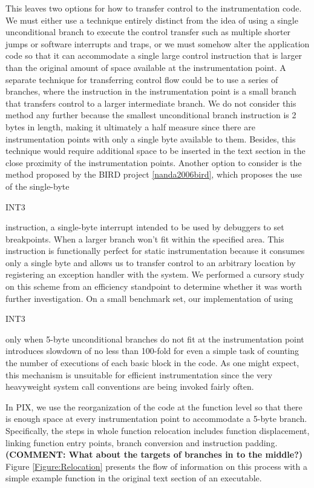 This leaves two options for how to transfer control to the instrumentation code.
We must either use a technique entirely distinct from the idea of using a single
unconditional branch to execute the control transfer such as multiple shorter
jumps or software interrupts and traps, or we must somehow alter the application code so
that it can accommodate a single large control instruction that is larger than
the original amount of space available at the instrumentation point. A separate
technique for transferring control flow could be to use a series of branches,
where the instruction in the instrumentation point is a small branch that
transfers control to a larger intermediate branch. We do not consider this
method any further because the smallest unconditional branch instruction is 2
bytes in length, making it ultimately a half measure since there are
instrumentation points with only a single byte available to them. Besides, this technique would
require additional space to be inserted in the text section in the close proximity of
the instrumentation points. Another option
to consider is the method proposed by the BIRD project \ref{nanda2006bird}, which
proposes the use of the single-byte \begin{it}INT3\end{it} instruction, a single-byte
interrupt intended to be used by debuggers to set breakpoints. When a larger
branch won't fit within the specified area. This instruction is functionally
perfect for static instrumentation because it consumes only a single byte and
allows us to transfer control to an arbitrary location by registering an
exception handler with the system. We performed a cursory study on this scheme
from an efficiency standpoint to determine whether it was worth further
investigation. On a small benchmark set, our implementation of using
\begin{it}INT3\end{it} only when 5-byte unconditional branches do not fit at
the instrumentation point introduces slowdown of no less than 100-fold for
even a simple task of counting the number of executions of each basic block in the code. As one might
expect, this mechanism is unsuitable for efficient instrumentation since the
very heavyweight system call conventions are being invoked fairly often.

In PIX, we use the reorganization of the code at the function level so that
there is enough space at every instrumentation point to accommodate a 5-byte
branch. Specifically, the steps in whole function relocation includes function displacement, linking function entry points,
branch conversion and instruction padding.  \textbf{(COMMENT: What about the targets of branches in to the middle?)}
Figure \ref{Figure:Relocation} presents the flow of information on this process with a simple example function in the original text section
of an executable.

